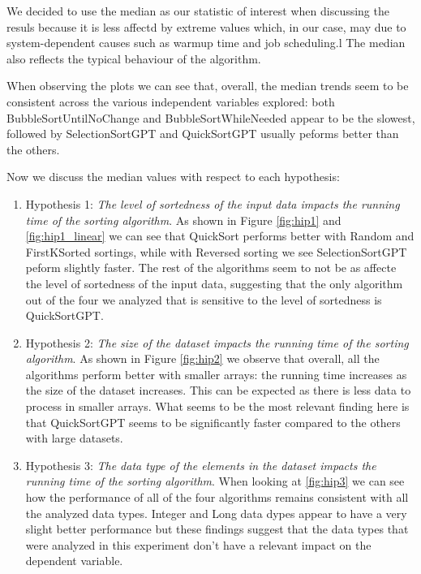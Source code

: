 \documentclass[unicode,11pt,a4paper,oneside,numbers=endperiod,openany]{scrartcl}
\begin{document}
    We decided to use the median as our statistic of interest when discussing the resuls because it is less affectd by extreme values which, in our case, may due to system-dependent causes such as warmup time and job scheduling.l The median also reflects the typical behaviour of the algorithm.

    When observing the plots we can see that, overall, the median trends seem to be consistent across the various independent variables explored: both BubbleSortUntilNoChange and BubbleSortWhileNeeded appear to be the slowest, followed by SelectionSortGPT and QuickSortGPT usually peforms better than the others. 

    Now we discuss the median values with respect to each hypothesis:

    \begin{enumerate}
        \item Hypothesis 1: \textit{ The level of sortedness of the input data impacts the running time of the sorting algorithm}. As shown in Figure \ref{fig:hip1} and \ref{fig:hip1_linear} we can see that QuickSort performs better with Random and FirstKSorted sortings, while with Reversed sorting we see SelectionSortGPT peform slightly faster. The rest of the algorithms seem to not be as affecte the level of sortedness of the input data, suggesting that the only algorithm out of the four we analyzed that is sensitive to the level of sortedness is QuickSortGPT.

        \item Hypothesis 2: \textit{The size of the dataset impacts the running time of the sorting algorithm}. As shown in Figure \ref{fig:hip2} we observe that overall, all the algorithms perform better with smaller arrays: the running time increases as the size of the dataset increases. This can be expected as there is less data to process in smaller arrays. What seems to be the most relevant finding here is that QuickSortGPT seems to be significantly faster compared to the others with large datasets.

        \item Hypothesis 3: \textit{The data type of the elements in the dataset impacts the running time of the sorting algorithm}. When looking at \ref{fig:hip3} we can see how the performance of all of the four algorithms remains consistent with all the analyzed data types. Integer and Long data dypes appear to have a very slight better performance but these findings suggest that the data types that were analyzed in this experiment don't have a relevant impact on the dependent variable.
    \end{enumerate}
\end{document}
